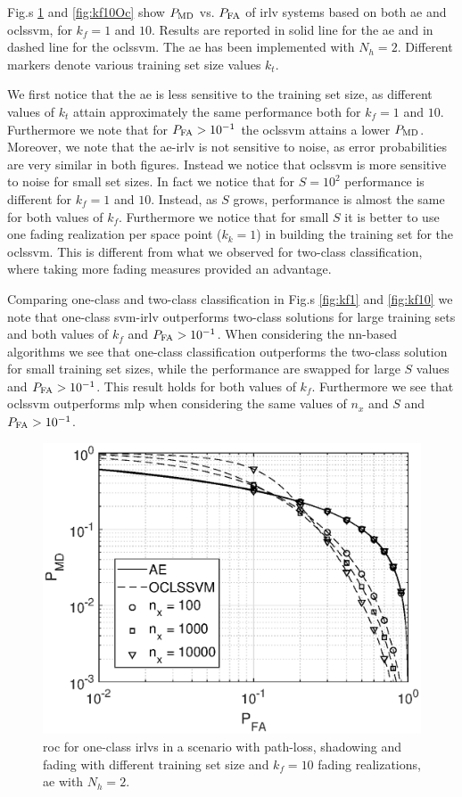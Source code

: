 \documentclass[draftcls,onecolumn,12pt]{IEEEtran}
\begin{document}
Fig.s \ref{fig:kf1Oc} and \ref{fig:kf10Oc} show $P_{\rm MD}$ vs. $P_{\rm FA}$ of \ac{irlv} systems based on  both \ac{ae} and \ac{oclssvm}, for $k_f = 1$ and $10$.  Results are reported in solid line for the \ac{ae} and in dashed line for the \ac{oclssvm}. The \ac{ae} has been implemented with $N_h=2$. Different markers denote various training set size values $k_t$.

We first notice that the \ac{ae} is less sensitive to the training set size, as different values of $k_t$ attain approximately the same performance both for $k_f=1$ and $10$. Furthermore we note that for $P_{\rm FA} > 10^{-1}$ the \ac{oclssvm} attains a lower  $P_{\rm MD}$. Moreover, we note that the \ac{ae}-\ac{irlv} is not sensitive to noise, as error probabilities are very similar in both figures. Instead we notice that  \ac{oclssvm} is more sensitive to noise for small set sizes. In fact we notice that for $S=10^2$ performance is different for $k_f=1$ and $10$. Instead, as $S$ grows, performance is almost the same for both values of $k_f$. Furthermore we notice that for small $S$ it is better to use one fading realization per space point ($k_k=1$) in building the training set for the \ac{oclssvm}. This is different  from what we observed for two-class classification, where taking more fading measures provided an advantage.  

Comparing one-class and two-class classification in Fig.s \ref{fig:kf1} and \ref{fig:kf10} we note that  one-class \ac{svm}-\ac{irlv} outperforms  two-class solutions for large training sets and  both values of $k_f$ and $P_{\rm FA}>10^{-1}$. When considering the \ac{nn}-based algorithms we see that one-class classification outperforms the two-class solution for small training set sizes, while the performance are swapped for large $S$ values and $P_{\rm FA} > 10^{-1}$. This result holds for both values of $k_f$. Furthermore we see that \ac{oclssvm} outperforms \ac{mlp} when considering the same values of $n_x$ and $S$ and $P_{\rm FA}> 10^{-1}$.


\begin{figure}[t]
    \centering
    \includegraphics[width=0.6\columnwidth]{res_avgnTrain_oneClass_kf1.eps}
    \caption{\ac{roc} for one-class \acp{irlv} in a scenario with path-loss, shadowing and fading with different training set size and $k_f=10$ fading realizations,  \ac{ae} with $N_h = 2$. }
    \label{fig:kf1Oc}
\end{figure}
\end{document}
